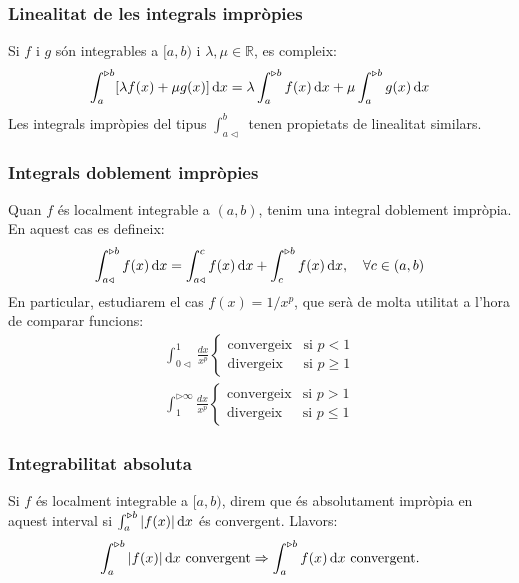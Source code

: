 \subsubsection*{Linealitat de les integrals impròpies}
Si $f$ i $g$ són integrables a $[a, b)$ i $\lambda, \mu \in \mathbb{R}$, es compleix:
\begin{align}
    \int_{a}^{\triangleright b} [ \lambda f(x) + \mu g(x) ] \mathop{}\!\mathrm{d} x = \lambda \int_{a}^{\triangleright b} f(x) \mathop{}\!\mathrm{d} x + \mu \int_{a}^{\triangleright b} g(x) \mathop{}\!\mathrm{d} x
\end{align}
Les integrals impròpies del tipus $\int_{a \triangleleft}^{b}$ tenen propietats de linealitat similars.

\subsubsection*{Integrals doblement impròpies}
Quan $f$ és localment integrable a $(a, b)$, tenim una integral doblement impròpia. En aquest cas es defineix:
\begin{align}
    \int_{a \triangleleft}^{\triangleright b} f(x) \mathop{}\!\mathrm{d} x = \int_{a \triangleleft}^{c} f(x) \mathop{}\!\mathrm{d} x + \int_{c}^{\triangleright b} f(x) \mathop{}\!\mathrm{d} x , \quad \forall c \in (a, b)
\end{align}
En particular, estudiarem el cas $f(x) = 1/x^{p}$, que serà de molta utilitat a l'hora de comparar funcions:
\begin{align}
    \int_{0 \triangleleft}^{1} \frac{dx}{x^{p}} 
    \begin{cases} \text{convergeix} & \text{si } p < 1 \\ \text{divergeix} & \text{si } p \geq 1 \end{cases} \\
    \int_{1}^{\triangleright \infty} \frac{dx}{x^{p}} 
    \begin{cases} \text{convergeix} & \text{si } p > 1 \\ \text{divergeix} & \text{si } p \leq 1 \end{cases}
\end{align}

\subsubsection*{Integrabilitat absoluta}
Si $f$ és localment integrable a $[a, b)$, direm que és absolutament impròpia en aquest interval si $\int_{a}^{\triangleright b} |f (x)| \mathop{}\!\mathrm{d} x$ és convergent. Llavors:
\begin{align}
    \int_{a}^{\triangleright b} |f(x)| \mathop{}\!\mathrm{d} x \text{ convergent} \Rightarrow \int_{a}^{\triangleright b} f(x) \mathop{}\!\mathrm{d} x \text{ convergent.}
\end{align}

